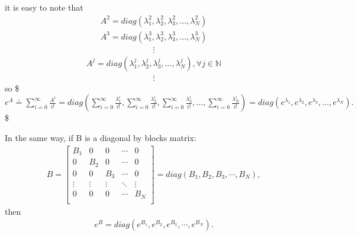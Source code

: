 \documentclass[letterpaper,10pt,english]{jupyterBook}
\begin{document}
\sphinxAtStartPar
it is easy to note that
\begin{equation*}
\begin{split}
    A^2 = diag \left(\lambda_1^2, \lambda_2^2, \lambda_3^2, \dotsc, \lambda_N^2 \right)
\end{split}
\end{equation*}\begin{equation*}
\begin{split}
    A^3 = diag \left(\lambda_1^3, \lambda_2^3, \lambda_3^3, \dotsc, \lambda_N^3 \right)
\end{split}
\end{equation*}\begin{equation*}
\begin{split}
\vdots
\end{split}
\end{equation*}\begin{equation*}
\begin{split}
    A^j = diag \left(\lambda_1^j, \lambda_2^j, \lambda_3^j, \dotsc, \lambda_N^j \right) , \forall j \in \mathbb{N}
\end{split}
\end{equation*}\begin{equation*}
\begin{split}
\vdots
\end{split}
\end{equation*}
\sphinxAtStartPar
so
\$\(
    e^A \doteq \sum_{i=0}^{\infty} \frac{A^i}{i!} = diag\left(\sum_{i=0}^{\infty} \frac{\lambda_1^i}{i!}, \sum_{i=0}^{\infty} \frac{\lambda_2^i}{i!}, \sum_{i=0}^{\infty} \frac{\lambda_3^i}{i!}, \dotsc, \sum_{i=0}^{\infty} \frac{\lambda_N^i}{i!}\right) = diag \left( e^{\lambda_1}, e^{\lambda_2}, e^{\lambda_3}, \dotsc, e^{\lambda_N} \right).
\)\$

\sphinxAtStartPar
In the same way, if B is a diagonal by blocks matrix:
\begin{equation*}
\begin{split}
B =   
\left[ {\begin{array}{ccccc}
    B_1 & 0 & 0 & \dotsm & 0\\
    0 & B_2 & 0 & \dotsm & 0\\
    0 & 0 & B_3 & \dotsm & 0\\
    \vdots & \vdots & \vdots & \ddots & \vdots\\
    0 & 0 & 0 & \dotsm & B_{N}\\
\end{array} } \right] 
  = diag(B_1, B_2, B_3, \dotsm, B_N),
\end{split}
\end{equation*}
\sphinxAtStartPar
then
\begin{equation*}
\begin{split}
e^B = diag(e^{B_1}, e^{B_2}, e^{B_3}, \dotsm, e^{B_N}).
\end{split}
\end{equation*}
\end{document}
